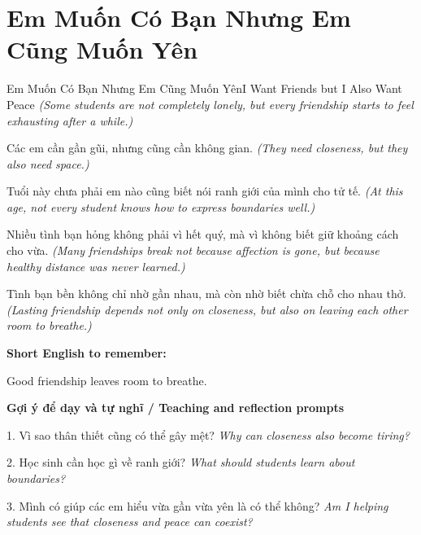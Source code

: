 \section{Em Muốn Có Bạn Nhưng Em Cũng Muốn Yên}
\begin{truyen}{Em Muốn Có Bạn Nhưng Em Cũng Muốn Yên}{I Want Friends but I Also Want Peace}
\textit{(Some students are not completely lonely, but every friendship starts to feel exhausting after a while.)}

Các em cần gần gũi, nhưng cũng cần không gian.
\textit{(They need closeness, but they also need space.)}

Tuổi này chưa phải em nào cũng biết nói ranh giới của mình cho tử tế.
\textit{(At this age, not every student knows how to express boundaries well.)}

Nhiều tình bạn hỏng không phải vì hết quý, mà vì không biết giữ khoảng cách cho vừa.
\textit{(Many friendships break not because affection is gone, but because healthy distance was never learned.)}

\end{truyen}

\begin{baihoc}
Tình bạn bền không chỉ nhờ gần nhau, mà còn nhờ biết chừa chỗ cho nhau thở.
\textit{(Lasting friendship depends not only on closeness, but also on leaving each other room to breathe.)}
\end{baihoc}

\begin{ghinhoanh}
\textbf{Short English to remember:}

Good friendship leaves room to breathe.

\end{ghinhoanh}

\begin{tuhocnhanh}
\textbf{Gợi ý để dạy và tự nghĩ / Teaching and reflection prompts}

1. Vì sao thân thiết cũng có thể gây mệt? \textit{Why can closeness also become tiring?}

2. Học sinh cần học gì về ranh giới? \textit{What should students learn about boundaries?}

3. Mình có giúp các em hiểu vừa gần vừa yên là có thể không? \textit{Am I helping students see that closeness and peace can coexist?}
\end{tuhocnhanh}
\ngancach

